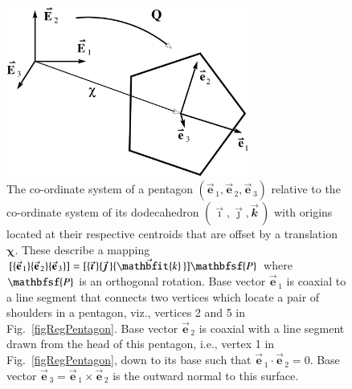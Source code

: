 \begin{figure}
    \centering
    \includegraphics[width=8cm]{figures/pentagonCoord.pdf}
    \caption{The co-ordinate system of a pentagon $( \vec{\mathbf{e}}_{\,1} , \vec{\mathbf{e}}_{\,2} , \vec{\mathbf{e}}_{\,3} )$ relative to the co-ordinate system of its dodecahedron $( \vec{\boldsymbol{\imath}} , \vec{\boldsymbol{\jmath}} , \vec{\mathbfit{k}} \,)$ with origins located at their respective centroids that are offset by a translation $\boldsymbol{\chi}$.  These describe a mapping $[ \{ \vec{\mathbf{e}}_{\,1} \} \{ \vec{\mathbf{e}}_{\,2} \} \{ \vec{\mathbf{e}}_{\,3} \} ] = [ \{ \vec{\boldsymbol{\imath}} \, \}\{ \vec{\boldsymbol{\jmath}} \, \}\{ \vec{\mathbfit{k}} \, \} ] \mathbfsf{P}$ where $\mathbfsf{P}$ is an orthogonal rotation.  Base vector $\vec{\mathbf{e}}_{\,1}$ is coaxial to a line segment that connects two vertices which locate a pair of shoulders in a pentagon, viz., vertices 2 and 5 in Fig.~\ref{figRegPentagon}.  Base vector $\vec{\mathbf{e}}_{\,2}$ is coaxial with a line segment drawn from the head of this pentagon, i.e., vertex 1 in Fig.~\ref{figRegPentagon}, down to its base such that $\vec{\mathbf{e}}_{\,1} \cdot \vec{\mathbf{e}}_{\,2} = 0$.  Base vector $\vec{\mathbf{e}}_{\,3} = \vec{\mathbf{e}}_{\,1} \times \vec{\mathbf{e}}_{\,2}$ is the outward normal to this surface.}
    \label{figPentagonCoord}
\end{figure}

